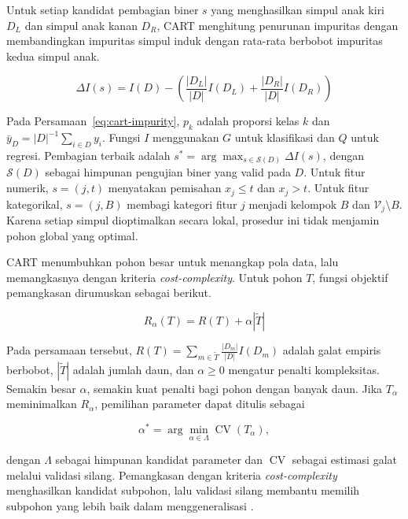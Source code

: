 Untuk setiap kandidat pembagian biner $s$ yang menghasilkan simpul anak kiri $D_L$ dan simpul anak kanan $D_R$, CART menghitung penurunan impuritas dengan membandingkan impuritas simpul induk dengan rata-rata berbobot impuritas kedua simpul anak.

\begin{equation}
    \Delta I(s)=I(D)-\left(\frac{|D_L|}{|D|}I(D_L)+\frac{|D_R|}{|D|}I(D_R)\right)
    \label{eq:cart-split}
\end{equation}

Pada Persamaan~\ref{eq:cart-impurity}, $p_k$ adalah proporsi kelas $k$ dan $\bar{y}_D=|D|^{-1}\sum_{i\in D}y_i$. Fungsi $I$ menggunakan $G$ untuk klasifikasi dan $Q$ untuk regresi. Pembagian terbaik adalah $s^*=\arg\max_{s\in\mathcal{S}(D)}\Delta I(s)$, dengan $\mathcal{S}(D)$ sebagai himpunan pengujian biner yang valid pada $D$. Untuk fitur numerik, $s=(j,t)$ menyatakan pemisahan $x_j\leq t$ dan $x_j>t$. Untuk fitur kategorikal, $s=(j,B)$ membagi kategori fitur $j$ menjadi kelompok $B$ dan $\mathcal{V}_j\setminus B$. Karena setiap simpul dioptimalkan secara lokal, prosedur ini tidak menjamin pohon global yang optimal.

CART menumbuhkan pohon besar untuk menangkap pola data, lalu memangkasnya dengan kriteria \textit{cost-complexity}. Untuk pohon $T$, fungsi objektif pemangkasan dirumuskan sebagai berikut.

\begin{equation}
    R_{\alpha}(T)=R(T)+\alpha|\widetilde{T}|
    \label{eq:cart-cost-complexity}
\end{equation}

Pada persamaan tersebut, $R(T)=\sum_{m\in\widetilde{T}}\frac{|D_m|}{|D|}I(D_m)$ adalah galat empiris berbobot, $|\widetilde{T}|$ adalah jumlah daun, dan $\alpha\geq0$ mengatur penalti kompleksitas. Semakin besar $\alpha$, semakin kuat penalti bagi pohon dengan banyak daun. Jika $T_\alpha$ meminimalkan $R_\alpha$, pemilihan parameter dapat ditulis sebagai

\begin{equation}
    \alpha^*=\arg\min_{\alpha\in\Lambda}\operatorname{CV}(T_\alpha),
    \label{eq:cart-alpha}
\end{equation}

dengan $\Lambda$ sebagai himpunan kandidat parameter dan $\operatorname{CV}$ sebagai estimasi galat melalui validasi silang. Pemangkasan dengan kriteria \textit{cost-complexity} menghasilkan kandidat subpohon, lalu validasi silang membantu memilih subpohon yang lebih baik dalam menggeneralisasi \cite{breiman1984cart}.


